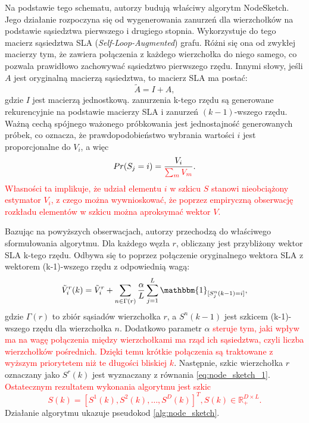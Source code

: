             Na podstawie tego schematu, autorzy budują właściwy algorytm NodeSketch. Jego działanie rozpoczyna się od wygenerowania zanurzeń dla wierzchołków na podstawie sąsiedztwa pierwszego i drugiego stopnia. Wykorzystuje do tego macierz sąsiedztwa SLA (\emph{Self-Loop-Augmented}) grafu. Różni się ona od zwykłej macierzy tym, że zawiera połączenia z każdego wierzchołka do niego samego, co pozwala prawidłowo zachowywać sąsiedztwo pierwszego rzędu. Innymi słowy, jeśli $A$ jest oryginalną macierzą sąsiedztwa, to macierz SLA ma postać:
            \[
                \tilde{A} = I + A,
            \]
            gdzie $I$ jest macierzą jednostkową. zanurzenia k-tego rzędu są generowane rekurencyjnie na podstawie macierzy SLA i zanurzeń $(k - 1)$-wszego rzędu. Ważną cechą spójnego ważonego próbkowania jest jednostajność generowanych próbek, co oznacza, że prawdopodobieństwo wybrania wartości $i$ jest proporcjonalne do $V_i$, a więc 
            \[
                Pr(S_j = i) = \frac{V_i}{\color{red} \sum_{m} V_m}.  
            \] \textcolor{red}{Własności ta implikuje, że udział elementu $i$ w szkicu $S$ stanowi nieobciążony estymator $V_i$, z czego można wywnioskować, że poprzez empiryczną obserwację rozkładu elementów w szkicu można aproksymać wektor $V$.} 
            
            Bazując na powyższych obserwacjach, autorzy przechodzą do właściwego sformułowania algorytmu. Dla każdego węzła $r$, obliczany jest przybliżony wektor SLA k-tego rzędu. Odbywa się to poprzez połączenie oryginalnego wektora SLA z wektorem (k-1)-wszego rzędu z odpowiednią wagą:
            \begin{equation} \label{eq:node_sketch_3}  
                \tilde{V}_{i}^{r}(k) = \tilde{V}_{i}^{r} + \sum\limits_{n \in 	\Gamma(r)} \frac{\alpha}{L} \sum\limits_{j = 1}^{L} \mathbbm{1}_{[S_{j}^{n}(k - 1) = i]},
            \end{equation}
            gdzie $\Gamma(r)$ to zbiór sąsiadów wierzchołka $r$, a $S^{n}(k-1)$ jest szkicem (k-1)-wszego rzędu dla wierzchołka $n$. Dodatkowo parametr $\alpha$ \textcolor{red}{steruje tym, jaki wpływ ma na wagę połączenia między wierzchołkami ma rząd ich sąsiedztwa, czyli liczba wierzchołków pośrednich. Dzięki temu krótkie połączenia są traktowane z wyższym priorytetem niż te długości bliskiej $k$}. Następnie, szkic wierzchołka $r$ oznaczany jako $S^{r}(k)$ jest wyznaczany z równania \ref{eq:node_sketch_1}. \textcolor{red}{Ostatecznym rezultatem wykonania algorytmu jest szkic 
            \[
                S(k) = [S^1(k), S^2(k), \dots, S^{D}(k)]^{T}, S(k) \in \mathbb{R}_{+}^{D \times L}.
            \]} 
            Działanie algorytmu ukazuje pseudokod \ref{alg:node_sketch}.

